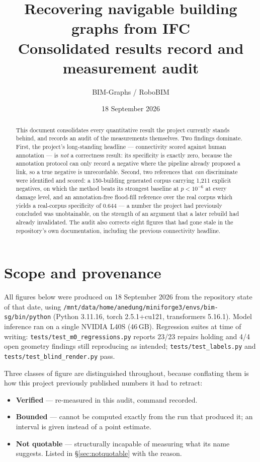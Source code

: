 \documentclass[11pt,a4paper]{article}
\title{\textbf{Recovering navigable building graphs from IFC}\\[2mm]
\large Consolidated results record and measurement audit}
\author{BIM-Graphs / RoboBIM}
\date{18 September 2026}
\newcommand{\code}[1]{\texttt{\small #1}}
\newcommand{\noquote}[1]{\textcolor{warn}{\textbf{#1}}}
\begin{document}
\maketitle

\begin{abstract}
\noindent
This document consolidates every quantitative result the project currently
stands behind, and records an audit of the measurements themselves. Two
findings dominate. First, the project's long-standing headline --- connectivity
scored against human annotation --- is \emph{not} a correctness result: its
specificity is exactly zero, because the annotation protocol can only record a
negative where the pipeline already proposed a link, so a true negative is
unrecordable. Second, two references that \emph{can} discriminate were
identified and scored: a 150-building generated corpus carrying 1{,}211 explicit
negatives, on which the method beats its strongest baseline at $p<10^{-6}$ at
every damage level, and an annotation-free flood-fill reference over the real
corpus which yields a real-corpus specificity of $0.644$ --- a number the
project had previously concluded was unobtainable, on the strength of an
argument that a later rebuild had already invalidated. The audit also corrects
eight figures that had gone stale in the repository's own documentation,
including the previous connectivity headline.
\end{abstract}

\section{Scope and provenance}

All figures below were produced on 18 September 2026 from the repository state of
that date, using \code{/mnt/data/home/anedung/miniforge3/envs/bim-sg/bin/python}
(Python 3.11.16, torch 2.5.1+cu121, transformers 5.16.1). Model inference ran on
a single NVIDIA L40S (46\,GB). Regression suites at time of writing:
\code{tests/test\_m0\_regressions.py} reports 23/23 repairs holding and 4/4 open
geometry findings still reproducing as intended; \code{tests/test\_labels.py} and
\code{tests/test\_blind\_render.py} pass.

Three classes of figure are distinguished throughout, because conflating them is
how this project previously published numbers it had to retract:

\begin{itemize}
  \item \textbf{Verified} --- re-measured in this audit, command recorded.
  \item \textbf{Bounded} --- cannot be computed exactly from the run that
        produced it; an interval is given instead of a point estimate.
  \item \noquote{Not quotable} --- structurally incapable of measuring what its
        name suggests. Listed in \S\ref{sec:notquotable} with the reason.
\end{itemize}
\end{document}
